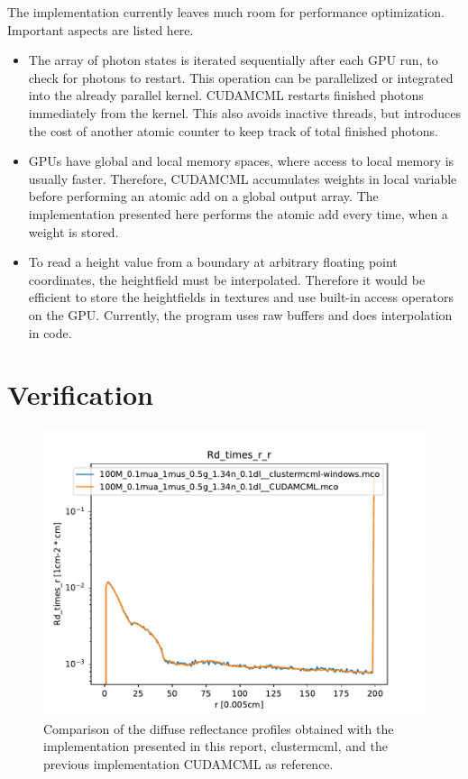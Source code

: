 \documentclass[]{article}
\begin{document}
The implementation currently leaves much room for performance optimization. Important aspects are listed here.

\begin{itemize}
\item The array of photon states is iterated sequentially after each GPU run, to check for photons to restart. This operation can be parallelized or integrated into the already parallel kernel. CUDAMCML restarts finished photons immediately from the kernel. This also avoids inactive threads, but introduces the cost of another atomic counter to keep track of total finished photons.
	
\item GPUs have global and local memory spaces, where access to local memory is usually faster. Therefore, CUDAMCML accumulates weights in local variable before performing an atomic add on a global output array. The implementation presented here performs the atomic add every time, when a weight is stored.
	
\item To read a height value from a boundary at arbitrary floating point coordinates, the heightfield must be interpolated. Therefore it would be efficient to store the heightfields in textures and use built-in access operators on the GPU. Currently, the program uses raw buffers and does interpolation in code.
\end{itemize}

\section{Verification}

\begin{figure}[ht!]
	\includegraphics[width=\linewidth]{img/verification1.pdf}
	\caption{Comparison of the diffuse reflectance profiles obtained with the implementation presented in this report, clustermcml, and the previous implementation CUDAMCML as reference.}
	\label{verification1}
\end{figure}
\end{document}

